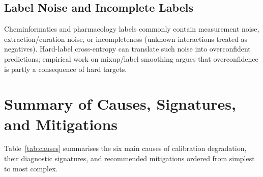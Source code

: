 \documentclass[11pt,a4paper,twocolumn]{article}
\begin{document}
\subsection{Label Noise and Incomplete Labels}
Cheminformatics and pharmacology labels commonly contain measurement noise,
extraction/curation noise, or incompleteness (unknown interactions treated
as negatives).
Hard-label cross-entropy can translate such noise into overconfident
predictions; empirical work on mixup/label smoothing argues that
overconfidence is partly a consequence of hard targets.

\section{Summary of Causes, Signatures, and Mitigations}

Table~\ref{tab:causes} summarises the six main causes of calibration
degradation, their diagnostic signatures, and recommended mitigations
ordered from simplest to most complex.
\end{document}
